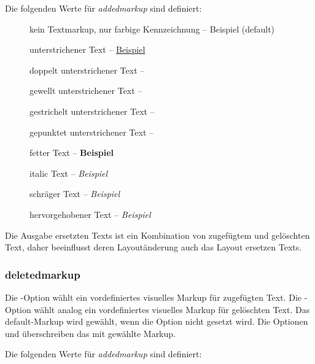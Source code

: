 Die folgenden Werte für \emph{addedmarkup} sind definiert:
\begin{description}
	\item [] kein Textmarkup, nur farbige Kennzeichnung -- {\color{orange} Beispiel} (default)
	\item [] unterstrichener Text -- \uline{Beispiel}
	\item [] doppelt unterstrichener Text -- 
	\item [] gewellt unterstrichener Text -- 
	\item [] gestrichelt unterstrichener Text -- 
	\item [] gepunktet unterstrichener Text -- 
	\item [] fetter Text -- \textbf{Beispiel}
	\item [] italic Text -- \textit{Beispiel}
	\item [] schräger Text -- \textsl{Beispiel}
	\item [] hervorgehobener Text -- \emph{Beispiel}
\end{description}

Die Ausgabe ersetzten Texts ist ein Kombination von zugefügtem und gelöschten Text, daher beeinflusst deren Layoutänderung auch das Layout ersetzen Texts.



\subsubsection{deletedmarkup}
\label{sec:ui:options:deletedmarkup}


Die -Option wählt ein vordefiniertes visuelles Markup für zugefügten Text.
Die -Option wählt analog ein vordefiniertes visuelles Markup für gelöschten Text.
Das default-Markup wird gewählt, wenn die Option nicht gesetzt wird.
Die Optionen  und  überschreiben das mit  gewählte Markup.

Die folgenden Werte für \emph{addedmarkup} sind definiert:

